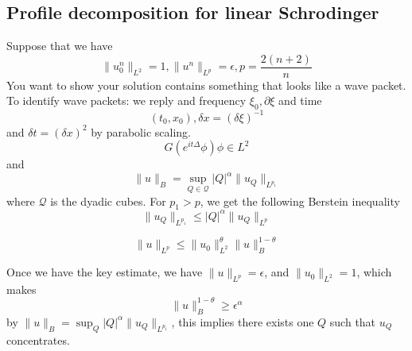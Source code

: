 \subsection{Profile decomposition for linear Schrodinger}
Suppose that we have
\begin{equation*}
    \|u_0^n\|_{L^2}=1, \|u^n\|_{L^p}=\epsilon, p=\frac{2(n+2)}{n}
\end{equation*}
You want to show your solution contains something that looks like a wave packet. To identify wave packets: we reply and frequency $\xi_0, \partial\xi$  and time
\begin{equation*}
    (t_0, x_0), \delta x=(\delta\xi)^{-1}
\end{equation*}
and $\delta t=(\delta x)^2$ by parabolic scaling.
\begin{equation*}
    G(e^{it\Delta}\phi)\phi\in L^2
\end{equation*}
and 
\begin{equation*}
    \|u\|_B=\sup_{Q\in\mathcal{Q}}|Q|^\alpha\|u_Q\|_{L^{p_1}}
\end{equation*}
where $\mathcal{Q}$ is the dyadic cubes. For $p_1>p$, we get the following Berstein inequality
\begin{equation*}
    \|u_Q\|_{L^{p_1}}\leq|Q|^\alpha\|u_Q\|_{L^p}
\end{equation*}
\begin{proposition}
    \begin{equation*}
        \|u\|_{L^p}\leq\|u_0\|_{L^2}^{\theta}\|u\|_B^{1-\theta}
    \end{equation*}
\end{proposition}
Once we have the key estimate, we have $\|u\|_{L^p}=\epsilon$, and $\|u_0\|_{L^2}=1$, which makes
\begin{equation*}
    \|u\|_B^{1-\theta}\geq\epsilon^\alpha
\end{equation*}
by $\|u\|_B=\sup_Q|Q|^\alpha\|u_Q\|_{L^{p_1}}$, this implies there exists one $Q$ such that $u_Q$ concentrates.
